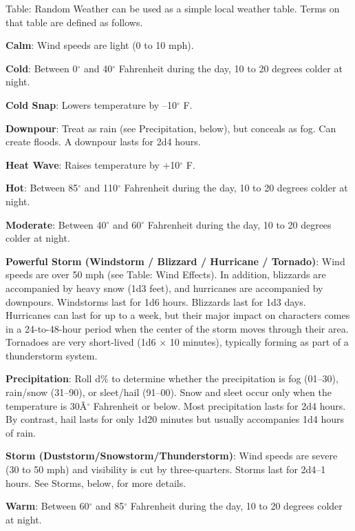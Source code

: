 Table: Random Weather can be used as a simple local weather table. Terms on that table are defined as follows.
				
\textbf{Calm}: Wind speeds are light (0 to 10 mph).
				
\textbf{Cold}: Between 0\mbox{${}^\circ$} and 40\mbox{${}^\circ$} Fahrenheit during the day, 10 to 20 degrees colder at night.
				
\textbf{Cold Snap}: Lowers temperature by --10\mbox{${}^\circ$} F.
				
\textbf{Downpour}: Treat as rain (see Precipitation, below), but conceals as fog. Can create floods. A downpour lasts for 2d4 hours.
				
\textbf{Heat Wave}: Raises temperature by +10\mbox{${}^\circ$} F.
				
\textbf{Hot}: Between 85\mbox{${}^\circ$} and 110\mbox{${}^\circ$} Fahrenheit during the day, 10 to 20 degrees colder at night.
				
\textbf{Moderate}: Between 40\mbox{${}^\circ$} and 60\mbox{${}^\circ$} Fahrenheit during the day, 10 to 20 degrees colder at night.
				
\textbf{Powerful Storm (Windstorm / Blizzard / Hurricane / Tornado)}: Wind speeds are over 50 mph (see Table: Wind Effects). In addition, blizzards are accompanied by heavy snow (1d3 feet), and hurricanes are accompanied by downpours. Windstorms last for 1d6 hours. Blizzards last for 1d3 days. Hurricanes can last for up to a week, but their major impact on characters comes in a 24-to-48-hour period when the center of the storm moves through their area. Tornadoes are very short-lived (1d6 \mbox{$\times$} 10 minutes), typically forming as part of a thunderstorm system. 
				
\textbf{Precipitation}: Roll d\% to determine whether the precipitation is fog (01--30), rain/snow (31--90), or sleet/hail (91--00). Snow and sleet occur only when the temperature is 30\^A\mbox{${}^\circ$} Fahrenheit or below. Most precipitation lasts for 2d4 hours. By contrast, hail lasts for only 1d20 minutes but usually accompanies 1d4 hours of rain.
				
\textbf{Storm (Duststorm/Snowstorm/Thunderstorm)}: Wind speeds are severe (30 to 50 mph) and visibility is cut by three-quarters. Storms last for 2d4--1 hours. See Storms, below, for more details. 
				
\textbf{Warm}: Between 60\mbox{${}^\circ$} and 85\mbox{${}^\circ$} Fahrenheit during the day, 10 to 20 degrees colder at night.
				
